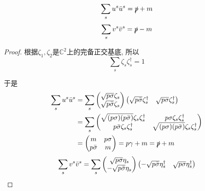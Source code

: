 \begin{theorem}
    \begin{equation}
        \sum_s u^s\bar u^s=\slashed p+m
    \end{equation}
    \begin{equation}
        \sum_s v^s\bar v^s=\slashed p-m
    \end{equation}
\end{theorem}
\begin{proof}
    根据$\zeta_1, \zeta_2$是$\mathbb{C}^2$上的完备正交基底, 所以
    \begin{equation}
        \sum_s \zeta_s\zeta_s^\dagger=1
    \end{equation}

    于是
    \begin{align}
        \sum_s u^s\bar u^s&=\sum_s\begin{pmatrix}
            \sqrt{p\sigma}\zeta_s\\
            \sqrt{p\bar\sigma}\zeta_s
        \end{pmatrix}\begin{pmatrix}
            \sqrt{p\bar\sigma}\zeta_s^\dagger & \sqrt{p\sigma}\zeta_s^\dagger
        \end{pmatrix}\notag\\
        &=\sum_s\begin{pmatrix}
            \sqrt{(p\sigma)(p\bar\sigma)}\zeta_s\zeta_s^\dagger & p\sigma\zeta_s\zeta_s^\dagger\\
            p\bar\sigma\zeta_s\zeta_s^\dagger & \sqrt{(p\sigma)(p\bar\sigma)}\zeta_s\zeta_s^\dagger
        \end{pmatrix}\notag\\
        &=\begin{pmatrix}
            m & p\sigma\\
            p\bar\sigma & m
        \end{pmatrix}=p\gamma+m=\slashed p+m
    \end{align}
    \begin{align}
        \sum_s v^s\bar v^s&=\sum_s\begin{pmatrix}
            \sqrt{p\sigma}\eta_s\\
            -\sqrt{p\bar\sigma}\eta_s
        \end{pmatrix}\begin{pmatrix}
            -\sqrt{p\bar\sigma}\eta_s^\dagger & \sqrt{p\sigma}\eta_s^\dagger
        \end{pmatrix}\notag\\

\end{align}
\end{proof}
